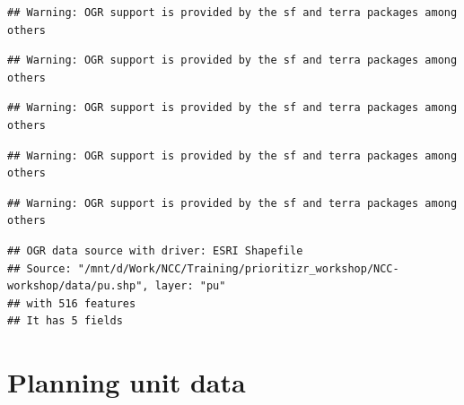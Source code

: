 \documentclass[12pt,]{book}
\newenvironment{Shaded}{\begin{snugshade}}{\end{snugshade}}
\newcommand{\CommentTok}[1]{\textcolor[rgb]{0.56,0.35,0.01}{\textit{#1}}}
\newcommand{\KeywordTok}[1]{\textcolor[rgb]{0.13,0.29,0.53}{\textbf{#1}}}
\newcommand{\NormalTok}[1]{#1}
\newcommand{\OperatorTok}[1]{\textcolor[rgb]{0.81,0.36,0.00}{\textbf{#1}}}
\newcommand{\StringTok}[1]{\textcolor[rgb]{0.31,0.60,0.02}{#1}}
\begin{document}
\begin{verbatim}
## Warning: OGR support is provided by the sf and terra packages among others
\end{verbatim}

\begin{verbatim}
## Warning: OGR support is provided by the sf and terra packages among others
\end{verbatim}

\begin{verbatim}
## Warning: OGR support is provided by the sf and terra packages among others
\end{verbatim}

\begin{verbatim}
## Warning: OGR support is provided by the sf and terra packages among others
\end{verbatim}

\begin{verbatim}
## Warning: OGR support is provided by the sf and terra packages among others
\end{verbatim}

\begin{verbatim}
## OGR data source with driver: ESRI Shapefile 
## Source: "/mnt/d/Work/NCC/Training/prioritizr_workshop/NCC-workshop/data/pu.shp", layer: "pu"
## with 516 features
## It has 5 fields
\end{verbatim}

\begin{Shaded}
\end{Shaded}

\clearpage

\hypertarget{planning-unit-data}{%
\section{Planning unit data}\label{planning-unit-data}}
\end{document}
